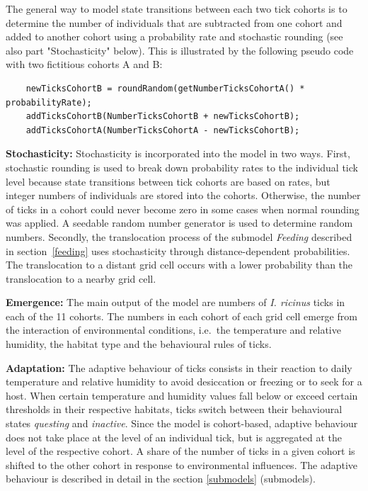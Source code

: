 \documentclass[a4paper, 11pt]{scrartcl}
\begin{document}
The general way to model state transitions between each two tick cohorts is to determine the number of individuals that are subtracted from one cohort and added to another cohort using a probability rate and stochastic rounding (see also part "Stochasticity" below). This is illustrated by the following pseudo code with two fictitious cohorts A and B:

\begin{lstlisting}
	newTicksCohortB = roundRandom(getNumberTicksCohortA() * probabilityRate);
	addTicksCohortB(NumberTicksCohortB + newTicksCohortB);
	addTicksCohortA(NumberTicksCohortA - newTicksCohortB);
\end{lstlisting}

\textbf{Stochasticity:} Stochasticity is incorporated into the model in two ways. First, stochastic rounding is used to break down probability rates to the individual tick level because state transitions between tick cohorts are based on rates, but integer numbers of individuals are stored into the cohorts. Otherwise, the number of ticks in a cohort could never become zero in some cases when normal rounding was applied. A seedable random number generator is used to determine random numbers. Secondly, the translocation process of the submodel \emph{Feeding} described in section~\ref{feeding} uses stochasticity through distance-dependent probabilities. The translocation to a distant grid cell occurs with a lower probability than the translocation to a nearby grid cell. 

\textbf{Emergence:} The main output of the model are numbers of \emph{I. ricinus} ticks in each of the 11 cohorts. The numbers in each cohort of each grid cell emerge from the interaction of environmental conditions, i.e.\ the temperature and relative humidity, the habitat type and the behavioural rules of ticks.

\textbf{Adaptation:} The adaptive behaviour of ticks consists in their reaction to daily temperature and relative humidity to avoid desiccation or freezing or to seek for a host. When certain temperature and humidity values fall below or exceed certain thresholds in their respective habitats, ticks switch between their behavioural states \emph{questing} and \emph{inactive}. Since the model is cohort-based, adaptive behaviour does not take place at the level of an individual tick, but is aggregated at the level of the respective cohort. A share of the number of ticks in a given cohort is shifted to the other cohort in response to environmental influences. The adaptive behaviour is described in detail in the section \ref{submodels} (submodels).
\end{document}
